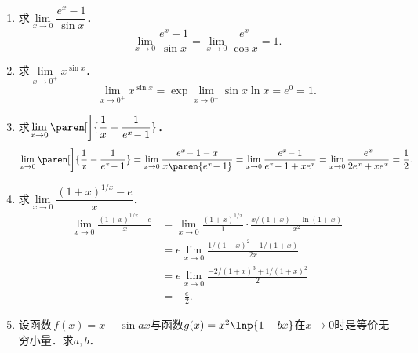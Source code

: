 \begin{enumerate}
\item 求\(\lim\limits_{x\to0} \dfrac{e^x\!-1}{\sin x}\)．
  \ifshowsol
    \begin{equation*}
      \lim_{x\to0} \frac{e^x\!-1}{\sin x}
      = \lim_{x\to0} \frac{e^x}{\cos x}
      = 1.
    \end{equation*}
  \fi

\item 求\(\!\lim\limits_{x\to0^+\!} x^{\sin x}\)．
  \ifshowsol
    \begin{equation*}
      \lim_{x\to0^+\!} x^{\sin x}
      = \exp \lim_{x\to0^+\!} \sin x \ln x
      = e^0 = 1.
    \end{equation*}
  \fi

\item 求\(\lim\limits_{x\to0} {}\paren[\bigg]{\dfrac1x - \dfrac1{e^x\!-1}}\)．
  \ifshowsol
    \begin{equation*}
      \lim_{x\to0} {}\paren[\bigg]{\frac1x - \frac1{e^x\!-1}}
      = \lim_{x\to0} \frac{e^x\!-1-x}{x \paren{e^x\!-1}}
      = \lim_{x\to0} \frac{e^x\!-1}{e^x\!-1 + xe^x}
      = \lim_{x\to0} \frac{e^x}{2e^x + xe^x}
      = \frac12.
    \end{equation*}
  \fi

\item 求\(\lim\limits_{x\to0} \dfrac{(1+x)^{1/x}\!-e}{x}\)．
  \ifshowsol
    \begin{equation*}
      \begin{split}
        \lim_{x\to0} \frac{(1+x)^{1/x}\!-e}{x}
        &= \lim_{x\to0} \frac{(1+x)^{1/x}}{1} \cdot \frac{x/(1+x) - \ln(1+x)}{x^2} \\
        &= e \lim_{x\to0} \frac{1/(1+x)^2 - 1/(1+x)}{2x} \\
        &= e \lim_{x\to0} \frac{-2/(1+x)^3 + 1/(1+x)^2}{2} \\
        &= - \frac e2.
      \end{split}
    \end{equation*}
  \fi

\item 设函数\(\,f(x) = x - \sin ax\)与函数\(g(x) = x^2 \lnp{1-bx}\)在\(x \to 0\)时是等价无穷小量．求\(a,b\)．


\end{enumerate}
